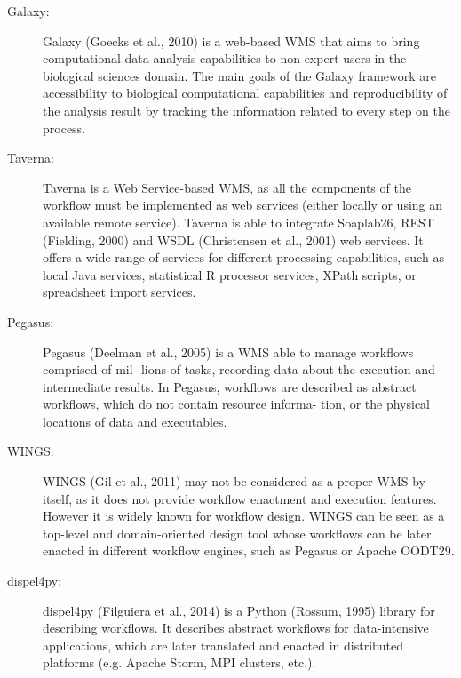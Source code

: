 \begin{description}
	\item [Galaxy:] Galaxy (Goecks et al., 2010) is a web-based WMS that aims to bring computational data analysis capabilities to non-expert users in the biological sciences domain. The main goals of the Galaxy framework are accessibility to biological computational capabilities and reproducibility of the analysis result by tracking the information related to every step on the process. 
	\item [Taverna: ] Taverna is a Web Service-based WMS, as all the components of the workflow must be implemented as web services (either locally or using an available remote service). Taverna is able to integrate Soaplab26, REST (Fielding, 2000) and WSDL (Christensen et al., 2001) web services. It offers a wide range of services for different processing capabilities, such as local Java services, statistical R processor services, XPath scripts, or spreadsheet import services.
	\item [Pegasus:] Pegasus (Deelman et al., 2005) is a WMS able to manage workflows comprised of mil- lions of tasks, recording data about the execution and intermediate results. In Pegasus, workflows are described as abstract workflows, which do not contain resource informa- tion, or the physical locations of data and executables.
	\item [WINGS:] WINGS (Gil et al., 2011) may not be considered as a proper WMS by itself, as it does not provide workflow enactment and execution features. However it is widely known for workflow design. WINGS can be seen as a top-level and domain-oriented design tool whose workflows can be later enacted in different workflow engines, such as Pegasus or Apache OODT29.
	\item [dispel4py:] dispel4py (Filguiera et al., 2014) is a Python (Rossum, 1995) library for describing workflows. It describes abstract workflows for data-intensive applications, which are later translated and enacted in distributed platforms (e.g. Apache Storm, MPI clusters, etc.).

\end{description} 



